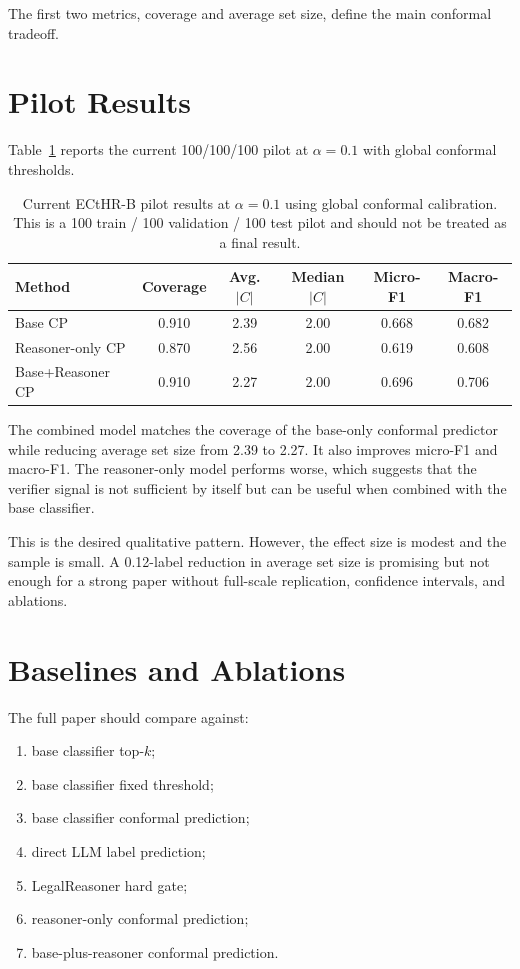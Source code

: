 \documentclass[11pt]{article}
\begin{document}
The first two metrics, coverage and average set size, define the main conformal tradeoff.

\section{Pilot Results}

Table~\ref{tab:pilot-global} reports the current 100/100/100 pilot at $\alpha=0.1$ with global conformal thresholds.

\begin{table}[h]
\centering
\begin{tabular}{lccccc}
\toprule
Method & Coverage & Avg. $|C|$ & Median $|C|$ & Micro-F1 & Macro-F1 \\
\midrule
Base CP & 0.910 & 2.39 & 2.00 & 0.668 & 0.682 \\
Reasoner-only CP & 0.870 & 2.56 & 2.00 & 0.619 & 0.608 \\
Base+Reasoner CP & 0.910 & 2.27 & 2.00 & 0.696 & 0.706 \\
\bottomrule
\end{tabular}
\caption{Current ECtHR-B pilot results at $\alpha=0.1$ using global conformal calibration. This is a 100 train / 100 validation / 100 test pilot and should not be treated as a final result.}
\label{tab:pilot-global}
\end{table}

The combined model matches the coverage of the base-only conformal predictor while reducing average set size from 2.39 to 2.27. It also improves micro-F1 and macro-F1. The reasoner-only model performs worse, which suggests that the verifier signal is not sufficient by itself but can be useful when combined with the base classifier.

This is the desired qualitative pattern. However, the effect size is modest and the sample is small. A 0.12-label reduction in average set size is promising but not enough for a strong paper without full-scale replication, confidence intervals, and ablations.

\section{Baselines and Ablations}

The full paper should compare against:
\begin{enumerate}
  \item base classifier top-$k$;
  \item base classifier fixed threshold;
  \item base classifier conformal prediction;
  \item direct LLM label prediction;
  \item LegalReasoner hard gate;
  \item reasoner-only conformal prediction;
  \item base-plus-reasoner conformal prediction.
\end{enumerate}
\end{document}
